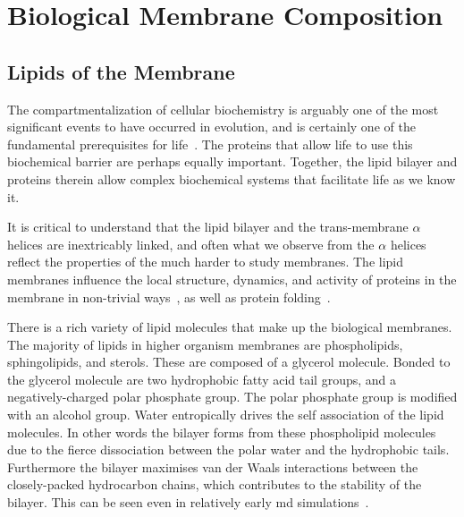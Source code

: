 \section{Biological Membrane Composition}

\subsection{Lipids of the Membrane}

The compartmentalization of cellular biochemistry is arguably one of the most significant events to have occurred in evolution, and is certainly one of the fundamental prerequisites for life~\cite{Koshland2002}.  The proteins that allow life to use this biochemical barrier are perhaps equally important. Together, the lipid bilayer and proteins therein allow complex biochemical systems that facilitate life as we know it.

It is critical to understand that the lipid bilayer and the trans-membrane $\alpha$ helices are inextricably linked, and often what we observe from the $\alpha$ helices reflect the properties of the much harder to study membranes. The lipid membranes influence the local structure, dynamics, and activity of proteins in the membrane in non-trivial ways~\cite{Bondar2010, Bondar2009, Jardon-Valadez2010, Kalvodova2005, Urban2005, White2001, Jensen2004, Henin2014}, as well as protein folding~\cite{Kauko2010}. %

There is a rich variety of lipid molecules that make up the biological membranes. The majority of lipids in higher organism membranes are phospholipids, sphingolipids, and sterols. These are composed of a glycerol molecule. Bonded to the glycerol molecule are two hydrophobic fatty acid tail groups, and a negatively-charged polar phosphate group. The polar phosphate group is modified with an alcohol group. Water entropically drives the self association of the lipid molecules. In other words the bilayer forms from these phospholipid molecules due to the fierce dissociation between the polar water and the hydrophobic tails. Furthermore the bilayer maximises van der Waals interactions between the closely-packed hydrocarbon chains, which contributes to the stability of the bilayer. This can be seen even in relatively early \gls{md} simulations~\cite{Goetz1998}.

